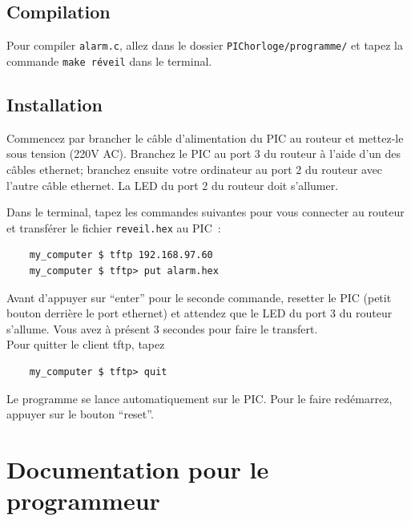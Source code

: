 \documentclass[12pt,a4paper]{article}
\begin{document}
\subsection{Compilation}
Pour compiler \texttt{alarm.c}, allez dans le dossier \texttt{PIChorloge/programme/} et tapez la commande \texttt{make réveil} dans le terminal.

\subsection{Installation}
Commencez par brancher le câble d'alimentation du PIC au routeur et mettez-le sous tension (220V AC). Branchez le PIC au port 3 du routeur à l'aide d'un des câbles ethernet; branchez ensuite votre ordinateur au port 2 du routeur avec l'autre câble ethernet. La LED du port 2 du routeur doit s'allumer.

Dans le terminal, tapez les commandes suivantes pour vous connecter au routeur et transférer le fichier \texttt{reveil.hex} au PIC~:
\begin{verbatim}
    my_computer $ tftp 192.168.97.60
    my_computer $ tftp> put alarm.hex
\end{verbatim}
Avant d'appuyer sur ``enter'' pour le seconde commande, resetter le PIC (petit bouton derrière le port ethernet) et attendez que le LED du port 3 du routeur s'allume. Vous avez à présent 3 secondes pour faire le transfert.\\
Pour quitter le client tftp, tapez
\begin{verbatim}
    my_computer $ tftp> quit
\end{verbatim}
Le programme se lance automatiquement sur le PIC. Pour le faire redémarrez, appuyer sur le bouton ``reset''.


\section{Documentation pour le programmeur}
\end{document}
